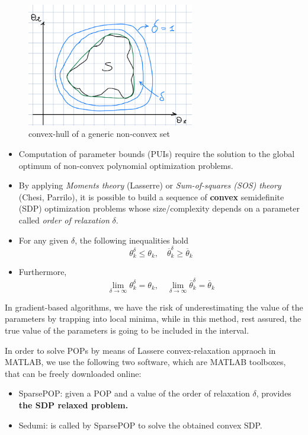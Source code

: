 \begin{figure}[htbp]  %
    \centering
    \includegraphics[width=0.65\textwidth]{images/convex-relaxation.png}
    \caption{convex-hull of a generic non-convex set}
    \label{fig:non-convex-FPS}
\end{figure}

\begin{itemize}
    \item Computation of parameter bounds (PUIs) require the solution to the global optimum of non-convex polynomial optimization problems.
    
    \item By applying \textit{Moments theory} (Lasserre) or \textit{Sum-of-squares (SOS) theory} (Chesi, Parrilo), it is possible to build a sequence of \textbf{convex} semidefinite (SDP) optimization problems whose size/complexity depends on a parameter called \textit{order of relaxation} \(\delta\).
    
    \item For any given \(\delta\), the following inequalities hold
    \[
    \theta^{\delta}_k \leq \theta_k, \quad \overline{\theta}^{\delta}_k \geq \overline{\theta}_k 
    \]
    
    \item Furthermore,
    \[
    \lim_{\delta \to \infty} \theta^{\delta}_k = \theta_k, \quad \lim_{\delta \to \infty} \overline{\theta}^{\delta}_k = \overline{\theta}_k
    \]
\end{itemize}

In gradient-based algorithms, we have the risk of underestimating the value of the parameters by trapping into local minima, while in this method, rest assured, the true value of the parameters is going to be included in the interval.

In order to solve POPs by means of Lassere convex-relaxation appraoch in MATLAB, we use the following two software, which are MATLAB toolboxes, that can be freely downloaded online:
\begin{itemize}
\item SparsePOP: given a POP and a value of the order of relaxation $\delta$, provides\textbf{ the SDP relaxed problem.}
\item Sedumi: is called by SparsePOP to solve the obtained convex SDP.
\end{itemize}

